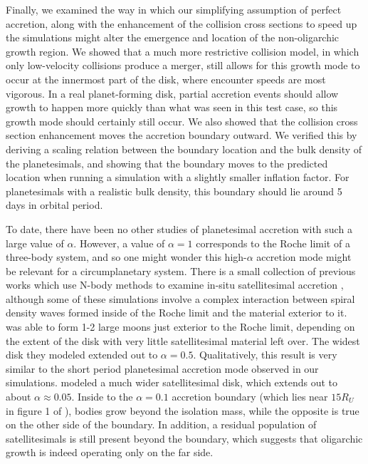 \documentclass[twocolumn]{aastex63}
\begin{document}
Finally, we examined the way in which our simplifying assumption of perfect accretion, along with the enhancement of the 
collision cross sections to speed up the simulations might alter the emergence and location of the non-oligarchic growth region. 
We showed that a much more restrictive collision model, in which only low-velocity collisions produce a merger, still allows for 
this growth mode to occur at the innermost part of the disk, where encounter speeds are most vigorous. In a real planet-forming 
disk, partial accretion events should allow growth to happen more quickly than what was seen in this test case, so this growth 
mode should certainly still occur. We also showed that the collision cross section enhancement moves the accretion boundary 
outward. We verified this by deriving a scaling relation between the boundary location and the bulk density of the planetesimals, 
and showing that the boundary moves to the predicted location when running a simulation with a slightly smaller inflation factor. 
For planetesimals with a realistic bulk density, this boundary should lie around 5 days in orbital period.

To date, there have been no other studies of planetesimal accretion
with such a large value of $\alpha$. However, a value of $\alpha = 1$
corresponds to the Roche limit of a three-body system, and so one
might wonder this high-$\alpha$ accretion mode might be relevant for a
circumplanetary system. There is a small collection of previous works
which use N-body methods to examine in-situ satellitesimal accretion
\citep{ida97, richardson00, kokubo00b, ida20}, although some of these simulations involve a complex interaction between spiral density waves formed inside of the Roche limit and the material exterior to it. \citet{ida97} was able to form 1-2
large moons just exterior to the Roche limit, depending on the extent of the disk with very little satellitesimal material left over. The widest disk they modeled extended out to $\alpha = 0.5$. Qualitatively, this result is very similar to the short period planetesimal accretion mode observed in our simulations. \citet{ida20} modeled a much wider satellitesimal disk, which extends out to about $\alpha \approx 0.05$. Inside to the $\alpha = 0.1$ accretion boundary (which lies near $15 R_{U}$ in figure 1 of \citet{ida20}), bodies grow beyond the isolation mass, while the opposite is true on the other side of the boundary. In addition, a residual population of satellitesimals is still present beyond the boundary, which suggests that oligarchic growth is indeed operating only on the far side.
\end{document}
